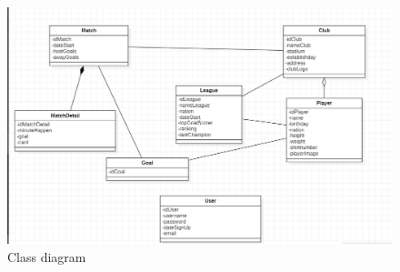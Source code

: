 \documentclass[12pt]{article}
\begin{document}
\begin{figure}[H]
\centering
\includegraphics[scale=0.4]{Figs/Class.png}
\caption{Class diagram}
\label{fig:image}
\end{figure}
\end{document}
